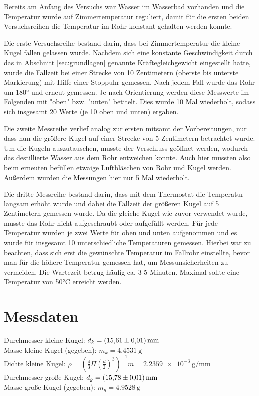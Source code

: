 Bereits am Anfang des Versuchs war Wasser im Wasserbad vorhanden und die Temperatur wurde auf Zimmertemperatur reguliert,
damit für die ersten beiden Versuchsreihen die Temperatur im Rohr konstant gehalten werden konnte.

Die erste Versuchsreihe bestand darin, dass bei Zimmertemperatur die kleine Kugel fallen gelassen wurde.
Nachdem sich eine konstante Geschwindigkeit durch das in Abschnitt \ref{sec:grundlagen} genannte Kräftegleichgewicht eingestellt hatte,
wurde die Fallzeit bei einer Strecke von 10 Zentimetern (oberste bis unterste Markierung)
mit Hilfe einer Stoppuhr gemessen.
Nach jedem Fall wurde das Rohr um 180° und erneut gemessen.
Je nach Orientierung werden diese Messwerte im Folgenden mit "oben" bzw. "unten" betitelt.
Dies wurde 10 Mal wiederholt, sodass sich insgesamt 20 Werte (je 10 oben und unten) ergaben.

Die zweite Messreihe verlief analog zur ersten mitsamt der Vorbereitungen, nur dass nun die größere Kugel auf einer Strecke von 5 Zentimetern betrachtet wurde.
Um die Kugeln auszutauschen, musste der Verschluss geöffnet werden, wodurch das destillierte Wasser aus dem Rohr entweichen konnte.
Auch hier mussten also beim erneuten befüllen etwaige Luftbläschen von Rohr und Kugel werden.
Außerdem wurden die Messungen hier nur 5 Mal wiederholt.

Die dritte Messreihe bestand darin, dass mit dem Thermostat die Temperatur langsam erhöht wurde
und dabei die Fallzeit der größeren Kugel auf 5 Zentimetern gemessen wurde.
Da die gleiche Kugel wie zuvor verwendet wurde, musste das Rohr nicht aufgeschraubt oder aufgefüllt werden.
Für jede Temperatur wurden je zwei Werte für oben und unten aufgenommen und es wurde für insgesamt 10 unterschiedliche Temperaturen gemessen.
Hierbei war zu beachten, dass sich erst die gewünschte Temperatur im Fallrohr einstellte, bevor man für die höhere Temperatur gemessen hat, 
um Messunsicherheiten zu vermeiden. Die Wartezeit betrug häufig ca. 3-5 Minuten. Maximal sollte eine Temperatur von 50°C erreicht werden.

\section{Messdaten}
Durchmesser kleine Kugel: $ d_k = \qty{15.61 \pm 0.01}{\mm}$\\
Masse kleine Kugel (gegeben): $ m_k = \qty{4.4531}{\g}$\\
Dichte kleine Kugel: $ \rho  = \left(\frac{4}{3}\Pi \left(\frac{d}{2}\right)^{3}\right)^{-1} m = \qty{2.2359e-3}{\g\per\mm}$\\
Durchmesser große Kugel: $ d_g = \qty{15.78 \pm 0.01}{\mm}$\\
Masse große Kugel (gegeben): $ m_g = \qty{4.9528}{\g}$



